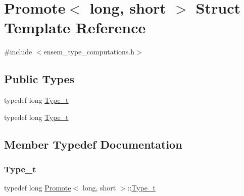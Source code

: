 \hypertarget{structPromote_3_01long_00_01short_01_4}{}\section{Promote$<$ long, short $>$ Struct Template Reference}
\label{structPromote_3_01long_00_01short_01_4}


{\ttfamily \#include $<$ensem\+\_\+type\+\_\+computations.\+h$>$}

\subsection*{Public Types}
\begin{DoxyCompactItemize}
\item 
typedef long \mbox{\hyperlink{structPromote_3_01long_00_01short_01_4_ac27097b9e5d53eee395af8cb8beb6cc1}{Type\+\_\+t}}
\item 
typedef long \mbox{\hyperlink{structPromote_3_01long_00_01short_01_4_ac27097b9e5d53eee395af8cb8beb6cc1}{Type\+\_\+t}}
\end{DoxyCompactItemize}


\subsection{Member Typedef Documentation}
\mbox{\label{structPromote_3_01long_00_01short_01_4_ac27097b9e5d53eee395af8cb8beb6cc1}} 
\subsubsection{\texorpdfstring{Type\_t}{Type\_t}\hspace{0.1cm}{\footnotesize\ttfamily [1/2]}}
{\footnotesize\ttfamily typedef long \mbox{\hyperlink{structPromote}{Promote}}$<$ long, short $>$\+::\mbox{\hyperlink{structPromote_3_01long_00_01short_01_4_ac27097b9e5d53eee395af8cb8beb6cc1}{Type\+\_\+t}}}

\mbox{\label{structPromote_3_01long_00_01short_01_4_ac27097b9e5d53eee395af8cb8beb6cc1}} 
